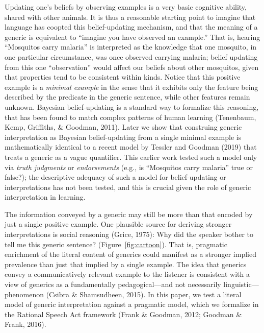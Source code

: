 \documentclass[floatsintext,doc]{apa6}
\begin{document}

Updating one's beliefs by observing examples is a very basic cognitive ability, shared with other animals. 
It is thus a reasonable starting point to imagine that language has coopted this belief-updating mechanism, and that the meaning of a generic is equivalent to ``imagine you have observed an example.''
That is, hearing \enquote{Mosquitos carry malaria} is interpreted as the knowledge that one mosquito, in one particular circumstance, was once observed carrying malaria; belief updating from this one ``observation'' would affect our beliefs about other mosquitos, given that properties tend to be consistent within kinds.
Notice that this positive example is a \emph{minimal example} in the sense that it exhibits only the feature being described by the predicate in the generic sentence, while other features remain unknown.
Bayesian belief-updating is a standard way to formalize this reasoning, that has been found to match complex patterns of human learning (Tenenbaum, Kemp, Griffiths, \& Goodman, 2011).
Later we show that construing generic interpretation as Bayesian belief-updating from a single minimal example is mathematically identical to a recent model by Tessler and Goodman (2019) that treats a generic as a vague quantifier.
This earlier work tested such a model only via \emph{truth judgments} or \emph{endorsements} (e.g., is \enquote{Mosquitos carry malaria} true or false?); the descriptive adequacy of such a model for belief-updating or interpretations has not been tested, and this is crucial given the role of generic interpretation in learning. 

The information conveyed by a generic may still be more than that encoded by just a single positive example.
One plausible source for deriving stronger interpretations is social reasoning (Grice, 1975): Why did the speaker bother to tell me this generic sentence? (Figure~\ref{fig:cartoon}).
That is, pragmatic enrichment of the literal content of generics could manifest as a stronger implied prevalence than just that implied by a single example.
The idea that generics convey a communicatively relevant example to the listener is consistent with a view of generics as a fundamentally pedagogical---and not necessarily linguistic---phenomenon (Csibra \& Shamsudheen, 2015).
In this paper, we test a literal model of generic interpretation against a pragmatic model, which we formalize in the Rational Speech Act framework (Frank \& Goodman, 2012; Goodman \& Frank, 2016).
\end{document}
